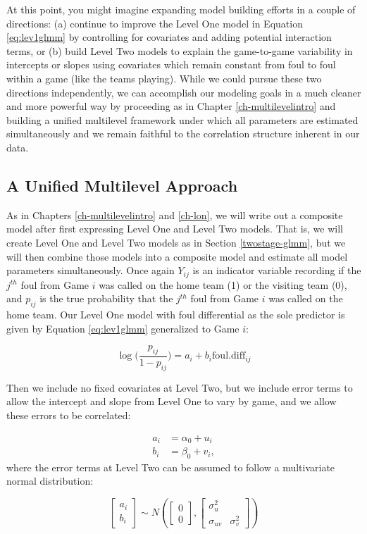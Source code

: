 \documentclass[
]{krantz}
\begin{document}
At this point, you might imagine expanding model building efforts in a couple of directions: (a) continue to improve the Level One model in Equation \eqref{eq:lev1glmm} by controlling for covariates and adding potential interaction terms, or (b) build Level Two models to explain the game-to-game variability in intercepts or slopes using covariates which remain constant from foul to foul within a game (like the teams playing). While we could pursue these two directions independently, we can accomplish our modeling goals in a much cleaner and more powerful way by proceeding as in Chapter \ref{ch-multilevelintro} and building a unified multilevel framework under which all parameters are estimated simultaneously and we remain faithful to the correlation structure inherent in our data.

\hypertarget{unified-glmm}{%
\subsection{A Unified Multilevel Approach}\label{unified-glmm}}

As in Chapters \ref{ch-multilevelintro} and \ref{ch-lon}, we will write out a composite model after first expressing Level One and Level Two models. That is, we will create Level One and Level Two models as in Section \ref{twostage-glmm}, but we will then combine those models into a composite model and estimate all model parameters simultaneously. Once again \(Y_{ij}\) is an indicator variable recording if the \(j^{th}\) foul from Game \(i\) was called on the home team (1) or the visiting team (0), and \(p_{ij}\) is the true probability that the \(j^{th}\) foul from Game \(i\) was called on the home team. Our Level One model with foul differential as the sole predictor is given by Equation \eqref{eq:lev1glmm} generalized to Game \(i\):

\[ \log\bigg(\frac{p_{ij}}{1-p_{ij}}\bigg)=a_i+b_i\mathrm{foul.diff}_{ij} \]

Then we include no fixed covariates at Level Two, but we include error terms to allow the intercept and slope from Level One to vary by game, and we allow these errors to be correlated:

\begin{align*}
a_i & = \alpha_{0}+u_i \\
b_i & = \beta_{0}+v_i,
\end{align*}
where the error terms at Level Two can be assumed to follow a multivariate normal distribution:

\[ \left[ \begin{array}{c}
            a_i \\ b_i
          \end{array}  \right] \sim N \left( \left[
          \begin{array}{c}
            0 \\ 0
          \end{array} \right], \left[
          \begin{array}{cc}
            \sigma_{u}^{2} & \\
            \sigma_{uv} & \sigma_{v}^{2}
          \end{array} \right] \right) \]
\end{document}
